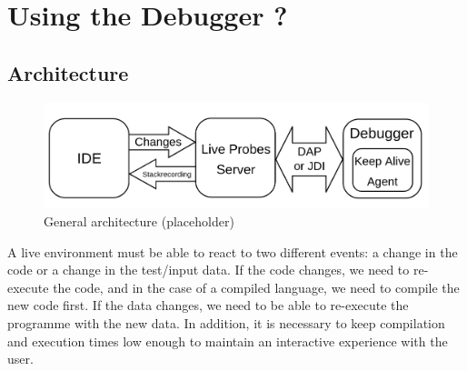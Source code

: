 \documentclass[english,submission]{programming}
\begin{document}
\section{Using the Debugger ?}

\subsection{Architecture}

\begin{figure}[h]
  \centering
  \includegraphics[width=0.8\linewidth]{img/architecture.png}
  \caption{General architecture (placeholder)}
  \label{fig:architecture}
\end{figure}

A live environment must be able to react to two different events: a change in the code or a change in the test/input data. 
If the code changes, we need to re-execute the code, and in the case of a compiled language, we need to compile the new code first. 
If the data changes, we need to be able to re-execute the programme with the new data. 
In addition, it is necessary to keep compilation and execution times low enough to maintain an interactive experience with the user.
\end{document}
